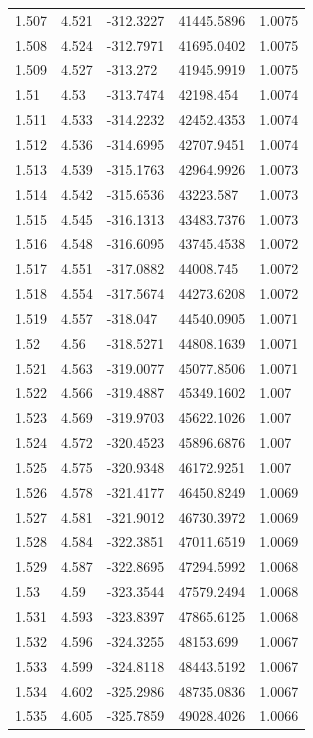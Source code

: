\begin{tabular}{lllll}
1.507 & 4.521 & -312.3227 & 41445.5896 & 1.0075 \\
1.508 & 4.524 & -312.7971 & 41695.0402 & 1.0075 \\
1.509 & 4.527 & -313.272 & 41945.9919 & 1.0075 \\
1.51 & 4.53 & -313.7474 & 42198.454 & 1.0074 \\
1.511 & 4.533 & -314.2232 & 42452.4353 & 1.0074 \\
1.512 & 4.536 & -314.6995 & 42707.9451 & 1.0074 \\
1.513 & 4.539 & -315.1763 & 42964.9926 & 1.0073 \\
1.514 & 4.542 & -315.6536 & 43223.587 & 1.0073 \\
1.515 & 4.545 & -316.1313 & 43483.7376 & 1.0073 \\
1.516 & 4.548 & -316.6095 & 43745.4538 & 1.0072 \\
1.517 & 4.551 & -317.0882 & 44008.745 & 1.0072 \\
1.518 & 4.554 & -317.5674 & 44273.6208 & 1.0072 \\
1.519 & 4.557 & -318.047 & 44540.0905 & 1.0071 \\
1.52 & 4.56 & -318.5271 & 44808.1639 & 1.0071 \\
1.521 & 4.563 & -319.0077 & 45077.8506 & 1.0071 \\
1.522 & 4.566 & -319.4887 & 45349.1602 & 1.007 \\
1.523 & 4.569 & -319.9703 & 45622.1026 & 1.007 \\
1.524 & 4.572 & -320.4523 & 45896.6876 & 1.007 \\
1.525 & 4.575 & -320.9348 & 46172.9251 & 1.007 \\
1.526 & 4.578 & -321.4177 & 46450.8249 & 1.0069 \\
1.527 & 4.581 & -321.9012 & 46730.3972 & 1.0069 \\
1.528 & 4.584 & -322.3851 & 47011.6519 & 1.0069 \\
1.529 & 4.587 & -322.8695 & 47294.5992 & 1.0068 \\
1.53 & 4.59 & -323.3544 & 47579.2494 & 1.0068 \\
1.531 & 4.593 & -323.8397 & 47865.6125 & 1.0068 \\
1.532 & 4.596 & -324.3255 & 48153.699 & 1.0067 \\
1.533 & 4.599 & -324.8118 & 48443.5192 & 1.0067 \\
1.534 & 4.602 & -325.2986 & 48735.0836 & 1.0067 \\
1.535 & 4.605 & -325.7859 & 49028.4026 & 1.0066 \\

\end{tabular}
